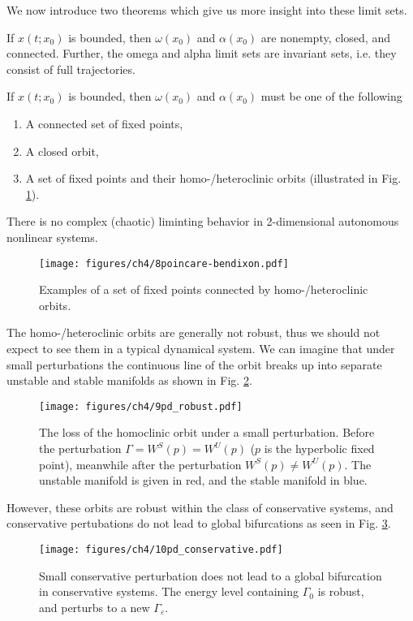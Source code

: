 We now introduce two theorems which give us more insight into these limit sets.
\begin{theorem}[]
	If $x(t;x_0)$ is bounded, then $\omega(x_0)$ and $\alpha(x_0)$ are nonempty, closed, and connected. Further, the omega and alpha limit sets are invariant sets, i.e. they consist of full trajectories.
\end{theorem}
\begin{theorem}
	If $x(t;x_0)$ is bounded, then $\omega(x_0)$ and $\alpha(x_0)$ must be one of the following 
	\begin{enumerate}
		\item A connected set of fixed points,
		\item A closed orbit,
		\item A set of fixed points and their homo-/heteroclinic orbits (illustrated in Fig. \ref{fig:poincare-bendixon}).
	\end{enumerate}
	There is no complex (chaotic) liminting behavior in 2-dimensional autonomous nonlinear systems. 
	\begin{figure}[h!]
		\centering
		\texttt{[image: figures/ch4/8poincare-bendixon.pdf]}
		\caption{Examples of a set of fixed points connected by homo-/heteroclinic orbits.}
		\label{fig:poincare-bendixon}
	\end{figure}	
\end{theorem}
\begin{remark}[]
	The homo-/heteroclinic orbits are generally not robust, thus we should not expect to see them in a typical dynamical system. We can imagine that under small perturbations the continuous line of the orbit breaks up into separate unstable and stable manifolds as shown in Fig. \ref{fig:pd_robust}.
	\begin{figure}[h!]
		\centering
		\texttt{[image: figures/ch4/9pd\_robust.pdf]}
		\caption{The loss of the homoclinic orbit under a small perturbation. Before the perturbation $\Gamma=W^{S}(p)=W^{U}(p)$ ($p$ is the hyperbolic fixed point), meanwhile after the perturbation $W ^{S}(p) \neq W^{U} (p)$. The unstable manifold is given in red, and the stable manifold in blue.}
		\label{fig:pd_robust}
	\end{figure}
	However, these orbits are robust within the class of conservative systems, and conservative pertubations do not lead to global bifurcations as seen in Fig. \ref{fig:pd_conservative}.
	\begin{figure}[h!]
		\centering
		\texttt{[image: figures/ch4/10pd\_conservative.pdf]}
		\caption{Small conservative perturbation does not lead to a global bifurcation in conservative systems. The energy level containing $\Gamma_0$ is robust, and perturbs to a new $\Gamma_\varepsilon$.}
		\label{fig:pd_conservative}
	\end{figure}
	
\end{remark}
